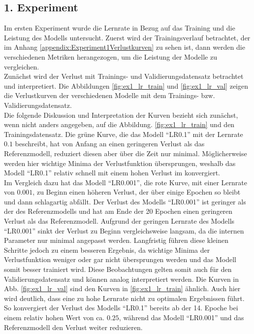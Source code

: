 \subsection{1. Experiment}
\label{subsec:1.Experiment}
Im ersten Experiment wurde die Lernrate in Bezug auf das Training und die Leistung des \gls{Modell}s untersucht. Zuerst wird der Trainingsverlauf betrachtet, der im Anhang \ref{appendix:Experiment1Verlustkurven} zu sehen ist, dann werden die verschiedenen Metriken herangezogen, um die Leistung der Modelle zu vergleichen. \\
Zunächst wird der Verlust mit Trainings- und Validierungsdatensatz betrachtet und interpretiert. Die Abbildungen \ref{fig:ex1_lr_train} und \ref{fig:ex1_lr_val} zeigen die Verlustkurven der verschiedenen Modelle mit dem Trainings- bzw. Validierungsdatensatz.\\ 
Die folgende Diskussion und Interpretation der Kurven bezieht sich zunächst, wenn nicht anders angegeben, auf die Abbildung. \ref{fig:ex1_lr_train} und den Trainingsdatensatz. Die grüne Kurve, die das Modell ``LR0.1'' mit der Lernrate $0.1$ beschreibt, hat von Anfang an einen geringeren Verlust als das Referenzmodell, reduziert diesen aber über die Zeit nur minimal. Möglicherweise werden hier wichtige Minima der Verlustfunktion übersprungen, weshalb das Modell ``LR0.1'' relativ schnell mit einem hohen Verlust im konvergiert.\\
Im Vergleich dazu hat das Modell ``LR0.001'', die rote Kurve, mit einer Lernrate von $0.001$, zu Beginn einen höheren Verlust, der über einige Epochen so bleibt und dann schlagartig abfällt. Der Verlust des Modells ``LR0.001'' ist geringer als der des Referenzmodells und hat am Ende der 20 Epochen einen geringeren Verlust als das Referenzmodell. Aufgrund der geringen Lernrate des Modells ``LR0.001'' sinkt der Verlust zu Beginn vergleichsweise langsam, da die internen Parameter nur minimal angepasst werden. Langfristig führen diese kleinen Schritte jedoch zu einem besseren Ergebnis, da wichtige Minima der Verlustfunktion weniger oder gar nicht übersprungen werden und das \gls{Modell} somit besser trainiert wird. Diese Beobachtungen gelten somit auch für den Validierungsdatensatz und können analog interpretiert werden. Die Kurven in Abb. \ref{fig:ex1_lr_val} sind den Kurven in \ref{fig:ex1_lr_train} ähnlich. Auch hier wird deutlich, dass eine zu hohe Lernrate nicht zu optimalen Ergebnissen führt. So konvergiert der Verlust des Modells ``LR0.1'' bereits ab der 14. Epoche bei einem relativ hohen Wert von ca. $0.25$, während das Modell ``LR0.001'' und das Referenzmodell den Verlust weiter reduzieren.

